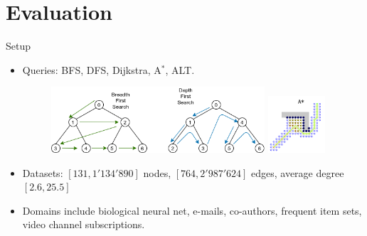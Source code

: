 \documentclass[rgb]{beamer}
\begin{document}
    \section{Evaluation}
        \begin{frame}[allowframebreaks]{Setup}
        \begin{itemize}
         \item Queries: BFS, DFS, Dijkstra, A$^*$, ALT. \\ [3em]       
            \begin{figure}
                \begin{center}
                \includegraphics[keepaspectratio, height=0.4\textheight, width=0.75\textwidth]{img/bfs-dfs.png} \hspace{0.7cm}
                \includegraphics[keepaspectratio, height=0.4\textheight, width=0.2\textwidth]{img/astar.png}
                \end{center}
            \end{figure}
            
            \framebreak
         \item Datasets: $[131, 1'134'890]$ nodes, $[764, 2'987'624]$ edges, average degree $[2.6, 25.5]$ \\ [3em]
         \item Domains include biological neural net, e-mails, co-authors, frequent item sets, video channel subscriptions.
        \end{itemize}
        \end{frame}
        
\end{document}
